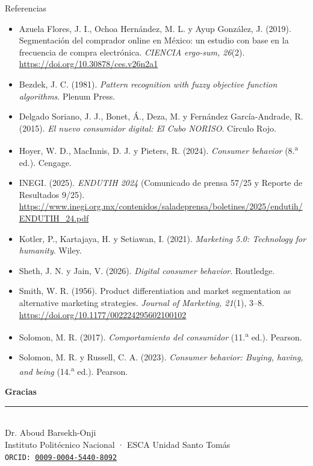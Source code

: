 \documentclass[aspectratio=169,xcolor=dvipsnames]{beamer}
\begin{document}
\begin{frame}{Referencias}
\tiny
\begin{itemize}
  \item[] Azuela Flores, J. I., Ochoa Hernández, M. L. y Ayup González, J. (2019). Segmentación del comprador online en México: un estudio con base en la frecuencia de compra electrónica. \textit{CIENCIA ergo-sum, 26}(2). \url{https://doi.org/10.30878/ces.v26n2a1}
  \item[] Bezdek, J. C. (1981). \textit{Pattern recognition with fuzzy objective function algorithms}. Plenum Press.
  \item[] Delgado Soriano, J. J., Bonet, Á., Deza, M. y Fernández García-Andrade, R. (2015). \textit{El nuevo consumidor digital: El Cubo NORISO}. Círculo Rojo.
  \item[] Hoyer, W. D., MacInnis, D. J. y Pieters, R. (2024). \textit{Consumer behavior} (8.\textsuperscript{a} ed.). Cengage.
  \item[] INEGI. (2025). \textit{ENDUTIH 2024} (Comunicado de prensa 57/25 y Reporte de Resultados 9/25). \url{https://www.inegi.org.mx/contenidos/saladeprensa/boletines/2025/endutih/ENDUTIH_24.pdf}
  \item[] Kotler, P., Kartajaya, H. y Setiawan, I. (2021). \textit{Marketing 5.0: Technology for humanity}. Wiley.
  \item[] Sheth, J. N. y Jain, V. (2026). \textit{Digital consumer behavior}. Routledge.
  \item[] Smith, W. R. (1956). Product differentiation and market segmentation as alternative marketing strategies. \textit{Journal of Marketing, 21}(1), 3--8. \url{https://doi.org/10.1177/002224295602100102}
  \item[] Solomon, M. R. (2017). \textit{Comportamiento del consumidor} (11.\textsuperscript{a} ed.). Pearson.
  \item[] Solomon, M. R. y Russell, C. A. (2023). \textit{Consumer behavior: Buying, having, and being} (14.\textsuperscript{a} ed.). Pearson.
\end{itemize}
\end{frame}

\begin{frame}
    \begin{center}
        {\Large \textcolor{IPNguinda}{\textbf{Gracias}}}\\[6pt]
        {\color{IPNdorado}\rule{0.4\linewidth}{1.2pt}}\\[6pt]
        Dr. Aboud Barsekh-Onji \\
        \small Instituto Politécnico Nacional · ESCA Unidad Santo Tomás \\
        \small \texttt{ORCID: \href{https://orcid.org/0009-0004-5440-8092}{0009-0004-5440-8092}}
    \end{center}
\end{frame}
\end{document}
